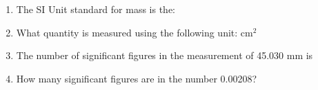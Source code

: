 \documentclass[main.tex]{subfiles}
\begin{document}
\begin{fullwidth}
\begin{multicols*}{2}
\begin{enumerate}
\item The SI Unit standard for mass is the:
\begin{enumerate}[label=(\alph*)]\vspace{-0.5cm}
\end{enumerate}

\item What quantity is measured using the following unit: $\text{cm}^2$
\begin{enumerate}[label=(\alph*)]\vspace{-0.5cm}
\end{enumerate}

\item The number of significant figures in the measurement of 45.030 mm is  
\begin{enumerate}[label=(\alph*)]\vspace{-0.5cm}
\end{enumerate}

\item How many significant figures are in the number 0.00208?  
\begin{enumerate}[label=(\alph*)]\vspace{-0.5cm}
\end{enumerate}


\end{enumerate}
\end{multicols*}
\end{fullwidth}
\end{document}
